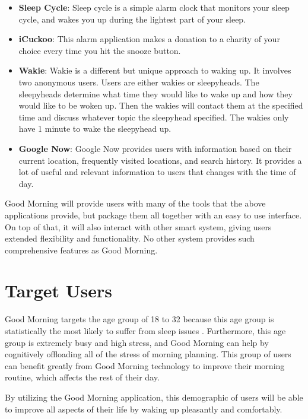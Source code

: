 \documentclass[11pt]{article}
\begin{document}
\begin{itemize}
\item
    \textbf{Sleep Cycle}: Sleep cycle is a simple alarm clock that monitors your sleep cycle, and wakes you up during the lightest part of your sleep.
\item
    \textbf{iCuckoo}: This alarm application makes a donation to a charity of your choice every time you hit the snooze button.
\item
    \textbf{Wakie}: Wakie is a different but unique approach to waking up. It involves two anonymous users. Users are either wakies or sleepyheads. The sleepyheads determine what time they would like to wake up and how they would like to be woken up. Then the wakies will contact them at the specified time and discuss whatever topic the sleepyhead specified. The wakies only have 1 minute to wake the sleepyhead up.
\item
	\textbf{Google Now}: Google Now provides users with information based on their current location, frequently visited locations, and search history. It provides a lot of useful and relevant information to users that changes with the time of day.
\end{itemize}

Good Morning will provide users with many of the tools that the above applications provide, but package them all together with an easy to use interface. On top of that, it will also interact with other smart system, giving users extended flexibility and functionality. No other system provides such comprehensive features as Good Morning.

\section{Target Users}\label{target-users}

Good Morning targets the age group of 18 to 32 because this age group is statistically the most likely to suffer from sleep issues \cite{sleepdisorders}. Furthermore, this age group is extremely busy and high stress, and Good Morning can help by cognitively offloading all of the stress of morning planning. This group of users can benefit greatly from Good Morning technology to improve their morning routine, which affects the rest of their day.

By utilizing the Good Morning application, this demographic of users will be able to improve all aspects of their life by waking up pleasantly and comfortably.
\end{document}
